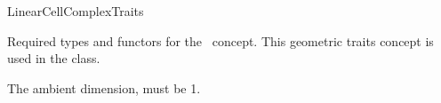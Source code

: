\ccRefPageBegin

\begin{ccRefConcept}{LinearCellComplexTraits}

Required types and functors for the \ccRefName\ concept. This
geometric traits concept is used in the 
class.  



\ccConstants
{}
{The ambient dimension, must be \mygt{}1.}

\ccTypes


\ccGlue
{}
\ccGlue
{}



\end{ccRefConcept}
